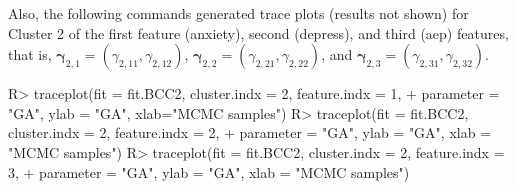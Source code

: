 

Also, the following commands generated trace plots (results not shown) for Cluster 2 of the first feature (anxiety), second (depress), and third (aep) features, that is,  $\boldsymbol{\gamma}_{2,1} = (\gamma_{2,11}, \gamma_{2,12})$,  $\boldsymbol{\gamma}_{2,2} = (\gamma_{2,21}, \gamma_{2,22})$, and $\boldsymbol{\gamma}_{2,3} = (\gamma_{2,31}, \gamma_{2,32})$. 

\begin{example}
R> traceplot(fit = fit.BCC2, cluster.indx = 2, feature.indx = 1,
+        parameter = "GA", ylab = "GA", xlab="MCMC samples")
R> traceplot(fit = fit.BCC2, cluster.indx = 2, feature.indx = 2,
+        parameter = "GA", ylab = "GA", xlab = "MCMC samples")
R> traceplot(fit = fit.BCC2, cluster.indx = 2, feature.indx = 3,
+        parameter = "GA", ylab = "GA", xlab = "MCMC samples")
\end{example} 




